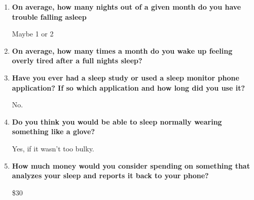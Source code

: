 \documentclass[finalProposal.tex]{subfiles}
\begin{document}
\bigskip

\begin{enumerate}
    \item {\bf{On average, how many nights out of a given month do you have trouble falling asleep}}

\smallskip
Maybe 1 or 2
\smallskip
    \item {\bf{On average, how many times a month do you wake up feeling overly tired after a full nights sleep?}}

\smallskip
    \item {\bf{Have you ever had a sleep study or used a sleep monitor phone application? If so which application and how long did you use it?}}

\smallskip
No.
\smallskip
    \item {\bf{Do you think you would be able to sleep normally wearing something like a glove?}}

\smallskip
Yes, if it wasn't too bulky.
\smallskip
    \item {\bf{How much money would you consider spending on something that analyzes your sleep and reports it back to your phone?}}

\smallskip
\$30
\smallskip
\end{enumerate}
\end{document}
